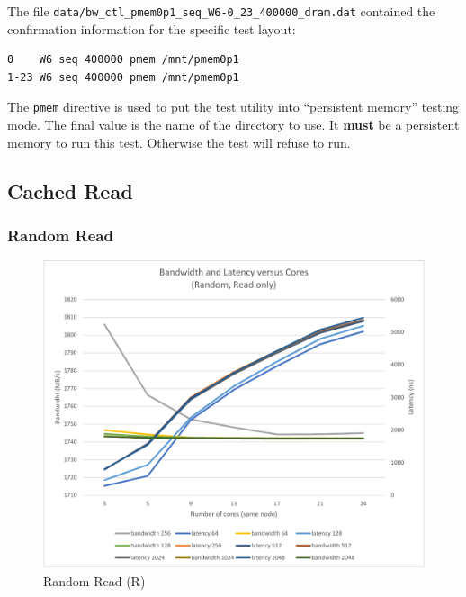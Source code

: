 The file \verb+data/bw_ctl_pmem0p1_seq_W6-0_23_400000_dram.dat+ contained the confirmation information
for the specific test layout:

\begin{verbatim}
0    W6 seq 400000 pmem /mnt/pmem0p1
1-23 W6 seq 400000 pmem /mnt/pmem0p1
\end{verbatim}

The \verb+pmem+ directive is used to put the test utility into ``persistent memory'' testing mode.
The final value is the name of the directory to use.  It \textbf{must} be a persistent memory
to run this test.  Otherwise the test will refuse to run.


\subsection{Cached Read}\label{mlc:r}

\subsubsection{Random Read}
\begin{figure}
    \centering
    \caption{Random Read (R)}\label{chart:random:read}
    \includegraphics[scale=0.5]{charts/random-r-crop.pdf}
\end{figure}

